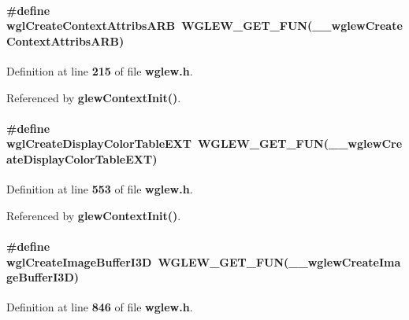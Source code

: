 \paragraph[{wgl\+Create\+Context\+Attribs\+A\+RB}]{\setlength{\rightskip}{0pt plus 5cm}\#define wgl\+Create\+Context\+Attribs\+A\+RB~{\bf W\+G\+L\+E\+W\+\_\+\+G\+E\+T\+\_\+\+F\+UN}({\bf \+\_\+\+\_\+wglew\+Create\+Context\+Attribs\+A\+RB})}\label{wglew_8h_acdca080586c894bbe2244900e8dfa24c}


Definition at line {\bf 215} of file {\bf wglew.\+h}.



Referenced by {\bf glew\+Context\+Init()}.

\paragraph[{wgl\+Create\+Display\+Color\+Table\+E\+XT}]{\setlength{\rightskip}{0pt plus 5cm}\#define wgl\+Create\+Display\+Color\+Table\+E\+XT~{\bf W\+G\+L\+E\+W\+\_\+\+G\+E\+T\+\_\+\+F\+UN}({\bf \+\_\+\+\_\+wglew\+Create\+Display\+Color\+Table\+E\+XT})}\label{wglew_8h_ad22c94ac36f62f8e2ab81fdeaee5d174}


Definition at line {\bf 553} of file {\bf wglew.\+h}.



Referenced by {\bf glew\+Context\+Init()}.

\paragraph[{wgl\+Create\+Image\+Buffer\+I3D}]{\setlength{\rightskip}{0pt plus 5cm}\#define wgl\+Create\+Image\+Buffer\+I3D~{\bf W\+G\+L\+E\+W\+\_\+\+G\+E\+T\+\_\+\+F\+UN}({\bf \+\_\+\+\_\+wglew\+Create\+Image\+Buffer\+I3D})}\label{wglew_8h_aea1acbdb20171dbe984539920ec46e4c}


Definition at line {\bf 846} of file {\bf wglew.\+h}.



